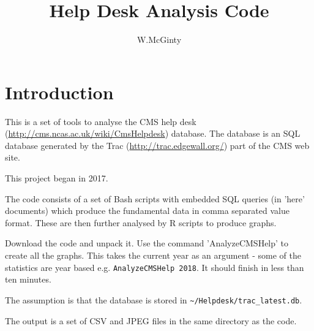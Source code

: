 \documentclass[11pt]{article} %
\title{Help Desk Analysis Code}
\author{W.McGinty}
\begin{document}
\maketitle


\section*{Introduction}

This is a set of tools to analyse the CMS help desk (\url{http://cms.ncas.ac.uk/wiki/CmsHelpdesk}) database.  The database is an SQL database generated by the Trac (\url{http://trac.edgewall.org/}) part of the CMS web site.

This project began in 2017.

The code consists of a set of Bash scripts with embedded SQL queries (in 'here' documents) which produce the fundamental data in comma separated value format.  These are then further analysed by R scripts to produce graphs.

Download the code and unpack it.  Use the command 'AnalyzeCMSHelp' to create all the graphs.  This takes the current year as an argument - some of the statistics are year based e.g. \verb|AnalyzeCMSHelp 2018|.  It should finish in less than ten minutes.

The assumption is that the database is stored in \verb|~/Helpdesk/trac_latest.db|.

The output is a set of CSV and JPEG files in the same directory as the code.
\end{document}
